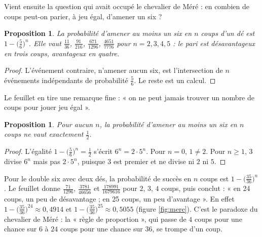 \documentclass[11pt,a4paper]{article}
\theoremstyle{plain}
\newtheorem{proposition}[theoreme]{Proposition}
\theoremstyle{definition}
\theoremstyle{remark}
\begin{document}
Vient ensuite la question qui avait occupé le chevalier de Méré : en combien de coups peut-on parier, à jeu égal, d'amener un six ?

\begin{proposition}\label{prop:six}
La probabilité d'amener au moins un six en $n$ coups d'un dé est $1-\big(\frac56\big)^n$. Elle vaut $\frac{11}{36}$, $\frac{91}{216}$, $\frac{671}{1296}$, $\frac{4651}{7776}$ pour $n=2,3,4,5$ : le pari est désavantageux en trois coups, avantageux en quatre.
\end{proposition}

\begin{proof}
L'événement contraire, n'amener aucun six, est l'intersection de $n$ événements indépendants de probabilité $\frac56$. Le reste est un calcul.
\end{proof}

Le feuillet en tire une remarque fine : « on ne peut jamais trouver un nombre de coups pour jouer jeu égal ».

\begin{proposition}\label{prop:jamais}
Pour aucun $n$, la probabilité d'amener au moins un six en $n$ coups ne vaut exactement $\frac12$.
\end{proposition}

\begin{proof}
L'égalité $1-\big(\frac56\big)^n=\frac12$ s'écrit $6^n=2\cdot5^n$. Pour $n=0$, $1\neq2$. Pour $n\geq1$, $3$ divise $6^n$ mais pas $2\cdot5^n$, puisque $3$ est premier et ne divise ni $2$ ni $5$.
\end{proof}

Pour le double six avec deux dés, la probabilité de succès en $n$ coups est $1-\big(\frac{35}{36}\big)^n$. Le feuillet donne $\frac{71}{1296}$, $\frac{3781}{46656}$ et $\frac{178991}{1679616}$ pour $2$, $3$, $4$ coups, puis conclut : « en 24 coups, un peu de désavantage ; en 25 coups, un peu d'avantage ». En effet $1-\big(\frac{35}{36}\big)^{24}\approx0{,}4914$ et $1-\big(\frac{35}{36}\big)^{25}\approx0{,}5055$ (figure \ref{fig:mere}). C'est le paradoxe du chevalier de Méré : la « règle de proportion », qui passe de $4$ coups pour une chance sur $6$ à $24$ coups pour une chance sur $36$, se trompe d'un coup.
\end{document}
